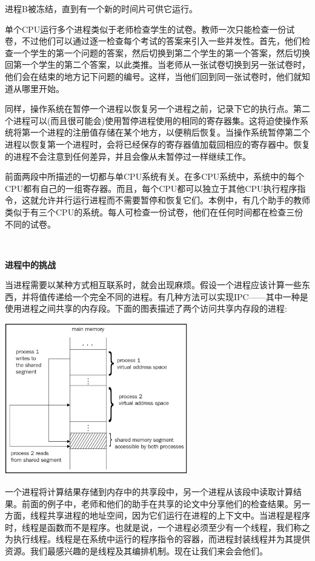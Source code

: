 进程B被冻结，直到有一个新的时间片可供它运行。 \par
单个CPU运行多个进程类似于老师检查学生的试卷。教师一次只能检查一份试卷，不过他们可以通过逐一检查每个考试的答案来引入一些并发性。首先，他们检查一个学生的第一个问题的答案，然后切换到第二个学生的第一个答案，然后切换回第一个学生的第二个答案，以此类推。当老师从一张试卷切换到另一张试卷时，他们会在结束的地方记下问题的编号。这样，当他们回到同一张试卷时，他们就知道从哪里开始。 \par
同样，操作系统在暂停一个进程以恢复另一个进程之前，记录下它的执行点。第二个进程可以(而且很可能会)使用暂停进程使用的相同的寄存器集。这将迫使操作系统将第一个进程的注册值存储在某个地方，以便稍后恢复。当操作系统暂停第二个进程以恢复第一个进程时，会将已经保存的寄存器值加载回相应的寄存器中。恢复的进程不会注意到任何差异，并且会像从未暂停过一样继续工作。 \par
前面两段中所描述的一切都与单CPU系统有关。在多CPU系统中，系统中的每个CPU都有自己的一组寄存器。而且，每个CPU都可以独立于其他CPU执行程序指令，这就允许并行运行进程而不需要暂停和恢复它们。本例中，有几个助手的教师类似于有三个CPU的系统。每人可检查一份试卷，他们在任何时间都在检查三份不同的试卷。 \par

\noindent\textbf{}\ \par
\textbf{进程中的挑战} \ \par
当进程需要以某种方式相互联系时，就会出现麻烦。假设一个进程应该计算一些东西，并将值传递给一个完全不同的进程。有几种方法可以实现IPC——其中一种是使用进程之间共享的内存段。下面的图表描述了两个访问共享内存段的进程: \par

\begin{center}
	\includegraphics[width=0.6\textwidth]{content/Section-2/Chapter-8/8}
\end{center}

一个进程将计算结果存储到内存中的共享段中，另一个进程从该段中读取计算结果。前面的例子中，老师和他们的助手在共享的论文中分享他们的检查结果。另一方面，线程共享进程的地址空间，因为它们运行在进程的上下文中。当进程是程序时，线程是函数而不是程序。也就是说，一个进程必须至少有一个线程，我们称之为执行线程。线程是在系统中运行的程序指令的容器，而进程封装线程并为其提供资源。我们最感兴趣的是线程及其编排机制。现在让我们来会会他们。 \par

